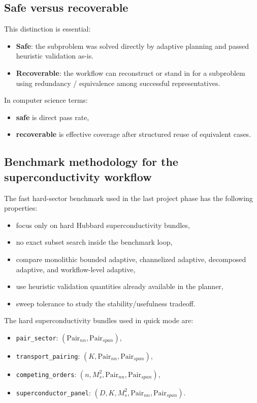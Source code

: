 \documentclass[11pt]{article}
\begin{document}
\subsection{Safe versus recoverable}

This distinction is essential:

\begin{itemize}
\item \textbf{Safe}: the subproblem was solved directly by adaptive planning and passed heuristic validation as-is.
\item \textbf{Recoverable}: the workflow can reconstruct or stand in for a subproblem using redundancy / equivalence among successful representatives.
\end{itemize}

In computer science terms:

\begin{itemize}
\item \textbf{safe} is direct pass rate,
\item \textbf{recoverable} is effective coverage after structured reuse of equivalent cases.
\end{itemize}

\subsection{Benchmark methodology for the superconductivity workflow}

The fast hard-sector benchmark used in the last project phase has the following properties:

\begin{itemize}
\item focus only on hard Hubbard superconductivity bundles,
\item no exact subset search inside the benchmark loop,
\item compare monolithic bounded adaptive, channelized adaptive, decomposed adaptive, and workflow-level adaptive,
\item use heuristic validation quantities already available in the planner,
\item sweep tolerance to study the stability/usefulness tradeoff.
\end{itemize}

The hard superconductivity bundles used in quick mode are:

\begin{itemize}
\item \texttt{pair\_sector}: \((\mathrm{Pair}_{nn}, \mathrm{Pair}_{span})\),
\item \texttt{transport\_pairing}: \((K,\mathrm{Pair}_{nn},\mathrm{Pair}_{span})\),
\item \texttt{competing\_orders}: \((n,M_s^2,\mathrm{Pair}_{nn},\mathrm{Pair}_{span})\),
\item \texttt{superconductor\_panel}: \((D,K,M_s^2,\mathrm{Pair}_{nn},\mathrm{Pair}_{span})\).
\end{itemize}
\end{document}
